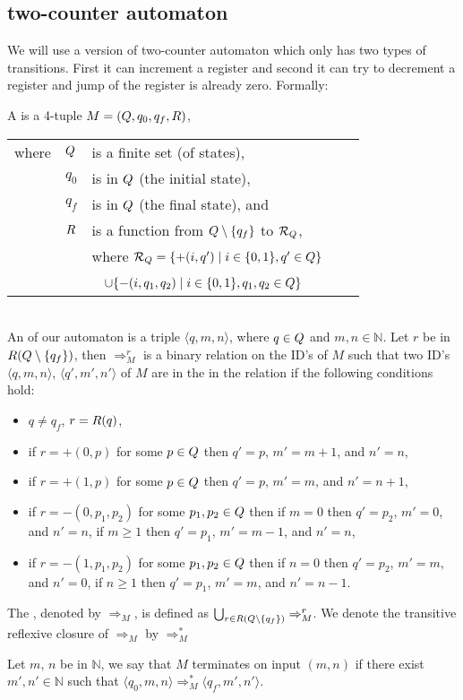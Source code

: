 \subsection{two-counter automaton} %
We will use a version of two-counter automaton which only has two types of transitions. First it can increment a register and second it can try to decrement a register and jump of the register is already zero. Formally:
\begin{definition}
	A  is a 4-tuple $M=(Q,q_0,q_f,R)$,
	\begin{tabular}{llp{0.78\linewidth}}
		where & $Q$      & is a finite set (of states),\\
		      & $q_0$ & is in $Q$ (the initial state),\\
		      & $q_f$ & is in $Q$ (the final state), and\\
		      & $R$ & is a function from $Q\setminus\{q_f\}$ to $\mathcal{R}_\autStates$,\\
		      & & where $\mathcal{R}_{Q}=\{+(i,q')\mid i\in\{0,1\},q'\in Q\}$\\
		      & &~ \hphantom{where $\mathcal{R}_\autStates$}$\cup\{-(i,q_1,q_2)\mid i\in\{0,1\},q_1,q_2\in Q\}$
	\end{tabular}\\
	An  of our automaton is a triple $\langle q,m,n\rangle$, where $q\in Q$ and $m,n\in\mathbb{N}$.
	Let $r$ be in $R(Q\setminus\{q_f\})$, then $\Rightarrow^r_M$ is a binary relation on the ID's of $M$ such that two ID's $\langle q,m,n\rangle$, $\langle q',m',n'\rangle$ of $M$ are in the in the relation if the following conditions hold:
	\begin{itemize}
		\item $q\neq q_f$, $r=R(q)$,
		\item if $r=+(0,p)$ for some $p\in Q$ then $q'=p$, $m'=m+1$, and $n'=n$,
		\item if $r=+(1,p)$ for some $p\in Q$ then $q'=p$, $m'=m$, and $n'=n+1$,
		\item if $r=-(0,p_1,p_2)$ for some $p_1,p_2\in Q$ then
			\subitem if $m=0$ then $q'=p_2$, $m'=0$, and $n'=n$,
			\subitem if $m\geq1$ then $q'=p_1$, $m'=m-1$, and $n'=n$,
		\item if $r=-(1,p_1,p_2)$ for some $p_1,p_2\in Q$ then
			\subitem if $n=0$ then $q'=p_2$, $m'=m$, and $n'=0$,
			\subitem if $n\geq1$ then $q'=p_1$, $m'=m$, and $n'=n-1$.
	\end{itemize}
	The , denoted by $\Rightarrow_M$, is defined as $\bigcup_{r\in R(Q\setminus\{q_f\})}\Rightarrow^r_M$. We denote the transitive reflexive closure of $\Rightarrow_M$ by $\Rightarrow^*_M$
	
	Let $m$, $n$ be in $\mathbb{N}$, we say that $M$ terminates on input $(m,n)$ if there exist $m',n'\in\mathbb{N}$ such that $\langle q_0,m,n\rangle\Rightarrow^*_M\langle q_f,m',n'\rangle$.
\end{definition}
